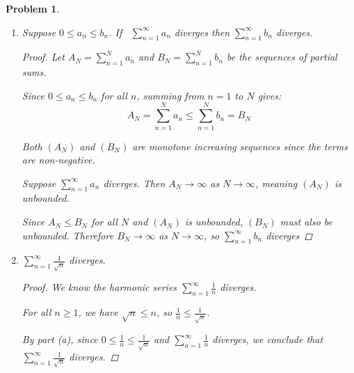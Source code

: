 \documentclass[12pt]{article}
\newtheorem{problem}{Problem}
\begin{document}
\begin{problem} %
\phantom{foo}


\renewcommand{\labelenumi}{(\alph{enumi})}
\begin{enumerate}
\item Suppose $0 \le a_n \le b_n$.  If \, $\displaystyle \sum_{n=1}^\infty a_n$ diverges then $\displaystyle \sum_{n=1}^\infty b_n$ diverges.

\begin{proof}
Let $A_N = \sum_{n=1}^N a_n$ and $B_N = \sum_{n=1}^N b_n$ be the sequences of partial sums.

Since $0 \leq a_n \leq b_n$ for all $n$, summing from $n=1$ to $N$ gives:
$$A_N = \sum_{n=1}^N a_n \leq \sum_{n=1}^N b_n = B_N$$

Both $(A_N)$ and $(B_N)$ are monotone increasing sequences since the terms are non-negative.

Suppose $\sum_{n=1}^\infty a_n$ diverges. Then $A_N \to \infty$ as $N \to \infty$, meaning $(A_N)$ is unbounded.

Since $A_N \leq B_N$ for all $N$ and $(A_N)$ is unbounded, $(B_N)$ must also be unbounded. Therefore $B_N \to \infty$ as $N \to \infty$, so $\sum_{n=1}^\infty b_n$ diverges
\end{proof}

\item $\displaystyle \sum_{n=1}^\infty \frac{1}{\sqrt{n}}$ diverges.

\begin{proof}
We know the harmonic series $\sum_{n=1}^\infty \frac{1}{n}$ diverges. 

For all $n \geq 1$, we have $\sqrt{n} \leq n$, so $\frac{1}{n} \leq \frac{1}{\sqrt{n}}$.

By part (a), since $0 \leq \frac{1}{n} \leq \frac{1}{\sqrt{n}}$ and $\sum_{n=1}^\infty \frac{1}{n}$ diverges, we conclude that $\sum_{n=1}^\infty \frac{1}{\sqrt{n}}$ diverges.
\end{proof}

\end{enumerate}
\end{problem}
\end{document}
